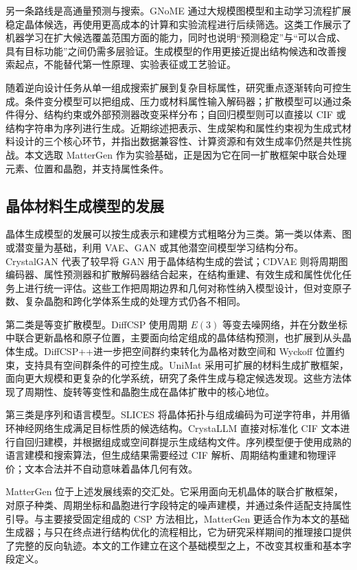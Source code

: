 另一条路线是高通量预测与搜索。GNoME 通过大规模图模型和主动学习流程扩展稳定晶体候选，再使用更高成本的计算和实验流程进行后续筛选\citep{merchant2023}。这类工作展示了机器学习在扩大候选覆盖范围方面的能力，同时也说明``预测稳定''与``可以合成、具有目标功能''之间仍需多层验证。生成模型的作用更接近提出结构候选和改善搜索起点，不能替代第一性原理、实验表征或工艺验证。

随着逆向设计任务从单一组成搜索扩展到复杂目标属性，研究重点逐渐转向可控生成。条件变分模型可以把组成、压力或材料属性输入解码器；扩散模型可以通过条件得分、结构约束或外部预测器改变采样分布；自回归模型则可以直接以 CIF 或结构字符串为序列进行生成。近期综述把表示、生成架构和属性约束视为生成式材料设计的三个核心环节，并指出数据兼容性、计算资源和有效生成率仍然是共性挑战\citep{long2024}。本文选取 MatterGen 作为实验基础，正是因为它在同一扩散框架中联合处理元素、位置和晶胞，并支持属性条件。

\subsection{晶体材料生成模型的发展}

晶体生成模型的发展可以按生成表示和建模方式粗略分为三类。第一类以体素、图或潜变量为基础，利用 VAE、GAN 或其他潜空间模型学习结构分布。CrystalGAN 代表了较早将 GAN 用于晶体结构生成的尝试\citep{nouira2018}；CDVAE 则将周期图编码器、属性预测器和扩散解码器结合起来，在结构重建、有效生成和属性优化任务上进行统一评估\citep{xie2022}。这些工作把周期边界和几何对称性纳入模型设计，但对变原子数、复杂晶胞和跨化学体系生成的处理方式仍各不相同。

第二类是等变扩散模型。DiffCSP 使用周期 \(E(3)\) 等变去噪网络，并在分数坐标中联合更新晶格和原子位置，主要面向给定组成的晶体结构预测，也扩展到从头晶体生成\citep{jiao2023}。DiffCSP++进一步把空间群约束转化为晶格对数空间和 Wyckoff 位置约束，支持具有空间群条件的可控生成\citep{jiao2024}。UniMat 采用可扩展的材料生成扩散框架，面向更大规模和更复杂的化学系统，研究了条件生成与稳定候选发现\citep{yang2024}。这些方法体现了周期性、旋转等变性和晶胞生成在晶体扩散中的核心地位。

第三类是序列和语言模型。SLICES 将晶体拓扑与组成编码为可逆字符串，并用循环神经网络生成满足目标性质的候选结构\citep{xiao2023}。CrystaLLM 直接对标准化 CIF 文本进行自回归建模，并根据组成或空间群提示生成结构文件\citep{antunes2024}。序列模型便于使用成熟的语言建模和搜索算法，但生成结果需要经过 CIF 解析、周期结构重建和物理评价；文本合法并不自动意味着晶体几何有效。

MatterGen 位于上述发展线索的交汇处。它采用面向无机晶体的联合扩散框架，对原子种类、周期坐标和晶胞进行字段特定的噪声建模，并通过条件适配支持属性引导\citep{zeni2025}。与主要接受固定组成的 CSP 方法相比，MatterGen 更适合作为本文的基础生成器；与只在终点进行结构优化的流程相比，它为研究采样期间的推理接口提供了完整的反向轨迹。本文的工作建立在这个基础模型之上，不改变其权重和基本字段定义。


